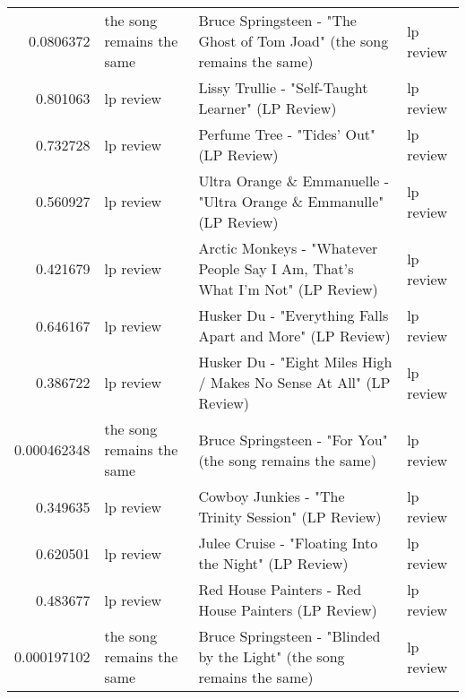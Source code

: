\documentclass[letterpaper,10pt]{article}
\begin{document}
\begin{table}[H]
\begin{adjustbox}{max width=\linewidth}
\begin{tabular}{rlll}
  0.0806372   & the song remains the same & Bruce Springsteen - "The Ghost of Tom Joad" (the song remains the same)                                      & lp review                 \\
  0.801063    & lp review                 & Lissy Trullie - "Self-Taught Learner" (LP Review)                                                            & lp review                 \\
  0.732728    & lp review                 & Perfume Tree - "Tides' Out" (LP Review)                                                                      & lp review                 \\
  0.560927    & lp review                 & Ultra Orange \& Emmanuelle - "Ultra Orange \& Emmanulle" (LP Review)                                           & lp review                 \\
  0.421679    & lp review                 & Arctic Monkeys - "Whatever People Say I Am, That's What I'm Not" (LP Review)                                 & lp review                 \\
  0.646167    & lp review                 & Husker Du - "Everything Falls Apart and More" (LP Review)                                                    & lp review                 \\
  0.386722    & lp review                 & Husker Du - "Eight Miles High / Makes No Sense At All" (LP Review)                                           & lp review                 \\
  0.000462348 & the song remains the same & Bruce Springsteen - "For You" (the song remains the same)                                                    & lp review                 \\
  0.349635    & lp review                 & Cowboy Junkies - "The Trinity Session" (LP Review)                                                           & lp review                 \\
  0.620501    & lp review                 & Julee Cruise - "Floating Into the Night" (LP Review)                                                         & lp review                 \\
  0.483677    & lp review                 & Red House Painters - Red House Painters (LP Review)                                                          & lp review                 \\
  0.000197102 & the song remains the same & Bruce Springsteen - "Blinded by the Light" (the song remains the same)                                       & lp review                 \\

\end{tabular}
\end{adjustbox}
\end{table}
\end{document}
